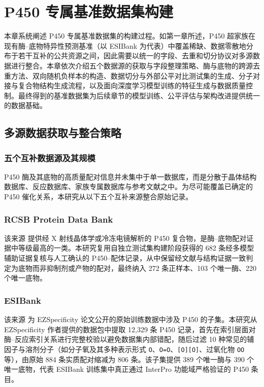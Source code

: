 
\chapter{P450 专属基准数据集构建}
\label{cha:dataset}

本章系统阐述 P450 专属基准数据集的构建过程。如第一章所述，P450 超家族在现有酶--底物特异性预测基准（以 ESIBank 为代表）中覆盖稀缺、数据零散地分布于若干互补的公共资源之间，因此需要以统一的字段、去重和切分协议对多源数据进行整合。本章依次介绍五个数据源的获取与字段整理策略、酶与底物的跨源去重方法、双向随机负样本的构造、数据切分与外部公平对比测试集的生成、分子对接与复合物结构生成流程，以及面向深度学习模型训练的特征生成与数据质量控制。最终得到的基准数据集为后续章节的模型训练、公平评估与架构改进提供统一的数据基础。

\section{多源数据获取与整合策略}
\label{sec:multisource}

\subsection{五个互补数据源及其规模}

P450 酶及其底物的高质量配对信息并未集中于单一数据库，而是分散于晶体结构数据库、反应数据库、家族专属数据库与参考文献之中。为尽可能覆盖已确定的 P450 催化关系，本研究从以下五个互补来源整合原始记录。

\subsection{RCSB Protein Data Bank}
\label{subsec:src-rcsb}

该来源\cite{Burley2025,Berman2000} 提供经 X 射线晶体学或冷冻电镜解析的 P450 复合物，是酶--底物配对证据中等级最高的一类。本研究复用自独立测试集构建阶段获得的 682 条经多模型辅助证据复核与人工确认的 P450--配体记录，从中保留经文献与结构证据一致判定为底物而非抑制剂或产物的配对，最终纳入 272 条正样本、103 个唯一酶、220 个唯一底物。

\subsection{ESIBank}
\label{subsec:src-esibank}

该来源\cite{EZSpec2025} 为 EZSpecificity 论文公开的原始训练数据中涉及 P450 的子集。本研究从 EZSpecificity 作者提供的数据包中提取 12{,}329 条 P450 记录，首先在索引层面对酶--反应索引关系进行完整校验以避免数据集内部错配，随后过滤 10 种常见的辅因子与溶剂分子（如分子氧及其多种表示形式 \texttt{O}、\texttt{O=O}、\texttt{[O][O]}、过氧化物 \texttt{OO} 等），由原始 884 条实质配对缩减为 806 条。该子集提供 389 个唯一酶与 390 个唯一底物，代表 ESIBank 训练集中真正通过 InterPro\cite{Blum2025} 功能域严格验证的 P450 条目。

